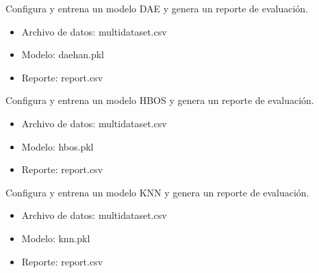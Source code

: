 \documentclass[letterpaper,10pt,english]{sphinxmanual}
\begin{document}
\begin{fulllineitems}
\label{\detokenize{tutorial:tutorial.daeTutorial}}
\pysigstartsignatures
{}
\pysigstopsignatures
\sphinxAtStartPar
Configura y entrena un modelo DAE y genera un reporte de evaluación.
\begin{itemize}
\item {} 
\sphinxAtStartPar
Archivo de datos: multi\sphinxhyphen{}dataset.csv

\item {} 
\sphinxAtStartPar
Modelo: daehan.pkl

\item {} 
\sphinxAtStartPar
Reporte: report.csv

\end{itemize}

\end{fulllineitems}


\begin{fulllineitems}
\label{\detokenize{tutorial:tutorial.hbosTutorial}}
\pysigstartsignatures
{}
\pysigstopsignatures
\sphinxAtStartPar
Configura y entrena un modelo HBOS y genera un reporte de evaluación.
\begin{itemize}
\item {} 
\sphinxAtStartPar
Archivo de datos: multi\sphinxhyphen{}dataset.csv

\item {} 
\sphinxAtStartPar
Modelo: hbos.pkl

\item {} 
\sphinxAtStartPar
Reporte: report.csv

\end{itemize}

\end{fulllineitems}


\begin{fulllineitems}
\label{\detokenize{tutorial:tutorial.knnTutorial}}
\pysigstartsignatures
{}
\pysigstopsignatures
\sphinxAtStartPar
Configura y entrena un modelo KNN y genera un reporte de evaluación.
\begin{itemize}
\item {} 
\sphinxAtStartPar
Archivo de datos: multi\sphinxhyphen{}dataset.csv

\item {} 
\sphinxAtStartPar
Modelo: knn.pkl

\item {} 
\sphinxAtStartPar
Reporte: report.csv

\end{itemize}

\end{fulllineitems}
\end{document}
